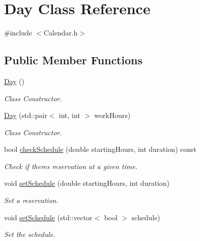 \hypertarget{class_day}{}\section{Day Class Reference}
\label{class_day}


{\ttfamily \#include $<$Calendar.\+h$>$}

\subsection*{Public Member Functions}
\begin{DoxyCompactItemize}
\item 
\mbox{\label{class_day_a0d38b5839dd80b179cb8f0669283b3aa}} 
\mbox{\hyperlink{class_day_a0d38b5839dd80b179cb8f0669283b3aa}{Day}} ()
\begin{DoxyCompactList}\small\item\em Class Constructor. \end{DoxyCompactList}\item 
\mbox{\hyperlink{class_day_a0ba7af88eca9b5e6ca197c3d40b3ca66}{Day}} (std\+::pair$<$ int, int $>$ work\+Hours)
\begin{DoxyCompactList}\small\item\em Class Constructor. \end{DoxyCompactList}\item 
bool \mbox{\hyperlink{class_day_ae8354b4a88cd98f5513ea6bc5dfb017e}{check\+Schedule}} (double starting\+Hours, int duration) const
\begin{DoxyCompactList}\small\item\em Check if there\textquotesingle{}s reservation at a given time. \end{DoxyCompactList}\item 
void \mbox{\hyperlink{class_day_ad3c8ca8c171a994c59788965166ae36b}{set\+Schedule}} (double starting\+Hours, int duration)
\begin{DoxyCompactList}\small\item\em Set a reservation. \end{DoxyCompactList}\item 
void \mbox{\hyperlink{class_day_aa46e0811bd26355979c6cf9f4e4b9df7}{set\+Schedule}} (std\+::vector$<$ bool $>$ schedule)
\begin{DoxyCompactList}\small\item\em Set the schedule. \end{DoxyCompactList}\item 

\end{DoxyCompactItemize}
